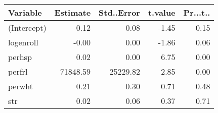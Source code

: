 \begin{tabular}{lrrrr}
  \hline
Variable & Estimate & Std..Error & t.value & Pr...t.. \\ 
  \hline
(Intercept) & -0.12 & 0.08 & -1.45 & 0.15 \\ 
  logenroll & -0.00 & 0.00 & -1.86 & 0.06 \\ 
  perhsp & 0.02 & 0.00 & 6.75 & 0.00 \\ 
  perfrl & 71848.59 & 25229.82 & 2.85 & 0.00 \\ 
  perwht & 0.21 & 0.30 & 0.71 & 0.48 \\ 
  str & 0.02 & 0.06 & 0.37 & 0.71 \\ 
   \hline
\end{tabular}
